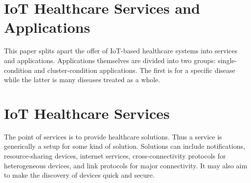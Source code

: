 \documentclass{article}
\begin{document}
\section*{IoT Healthcare Services and Applications}
This paper splits apart the offer of IoT-based healthcare systems into services and 
applications. Applications themselves are divided into two groups: single-condition and
cluster-condition applications. The first is for a specific disease while the latter
is many diseases treated as a whole. 

\section*{IoT Healthcare Services}
The point of services is to provide healthcare solutions. Thus a service is generically
a setup for some kind of solution. Solutions can include notifications, resource-sharing
devices, internet services, cross-connectivity protocols for heterogeneous devices, and
link protocols for major connectivity. It may also aim to make the discovery of devices
quick and secure. 
\end{document}

